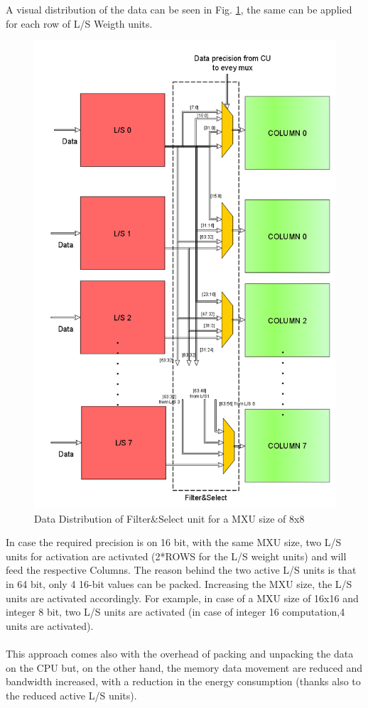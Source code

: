 A visual distribution of the data can be seen in Fig. \ref{fig:fscs}, the same can be applied for each row of L/S Weigth units.
\begin{figure}[H]
\centering
\captionsetup{justification=centering}
\includegraphics[scale=0.5,angle=0]{./figure/filter_and_select.png}
\caption{Data Distribution of Filter\&Select unit for a MXU size of 8x8}
\label{fig:fscs}
\end{figure} 


In case the required precision is on 16 bit, with the same MXU size, two L/S units for activation are activated (2*ROWS for the L/S weight units) and will feed the respective Columns. The reason behind the two active L/S units is that in 64 bit, only 4 16-bit values can be packed.
Increasing the MXU size, the L/S units are activated accordingly. For example, in case of a MXU size of 16x16 and integer 8 bit, two L/S units are activated (in case of integer 16 computation,4 units are activated).
\\\\
This approach comes also with the overhead of packing and unpacking the data on the CPU but, on the other hand, the memory data movement are reduced and bandwidth increased, with a reduction in the energy consumption (thanks also to the reduced active L/S units).


